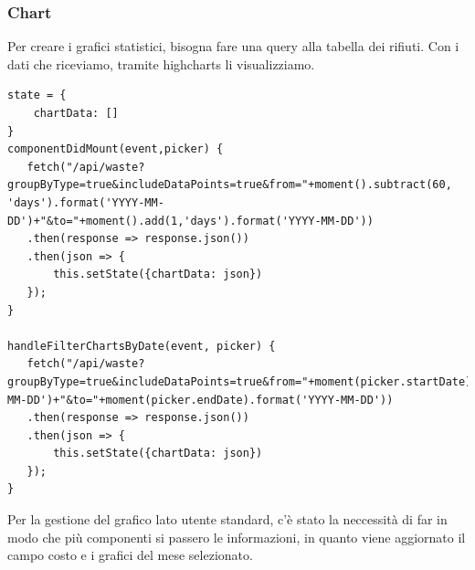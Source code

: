 \documentclass{report}
\begin{document}
\subsubsection{Chart}
Per creare i grafici statistici, bisogna fare una query alla tabella dei rifiuti. Con i dati che riceviamo, tramite
highcharts li visualizziamo.
\begin{lstlisting}
state = {
	chartData: []
}
componentDidMount(event,picker) {
   fetch("/api/waste?groupByType=true&includeDataPoints=true&from="+moment().subtract(60, 'days').format('YYYY-MM-DD')+"&to="+moment().add(1,'days').format('YYYY-MM-DD'))
   .then(response => response.json())
   .then(json => {
	   this.setState({chartData: json})
   });
}

handleFilterChartsByDate(event, picker) {
   fetch("/api/waste?groupByType=true&includeDataPoints=true&from="+moment(picker.startDate).format('YYYY-MM-DD')+"&to="+moment(picker.endDate).format('YYYY-MM-DD'))
   .then(response => response.json())
   .then(json => {
	   this.setState({chartData: json})
   });
}
\end{lstlisting}
Per la gestione del grafico lato utente standard, c'è stato la neccessità di far in modo che più componenti si passero le informazioni,
in quanto viene aggiornato il campo costo e i grafici del mese selezionato.
\end{document}
